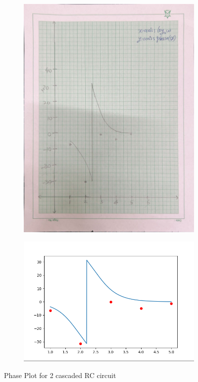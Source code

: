 \documentclass{article}
\begin{document}
\begin{figure}[H]
    \centering
    \begin{subfigure}[b]{0.45\textwidth}
        \centering
        \includegraphics[width=\textwidth]{figs/phase2.png}
    \end{subfigure}
    \hfill
    \begin{subfigure}[b]{0.45\textwidth}
        \centering
        \includegraphics[width=1.7\textwidth]{figs/phase_2cas.png}
    \end{subfigure}
    
    \caption{Phase Plot for 2 cascaded RC circuit}
\end{figure}
\end{document}
